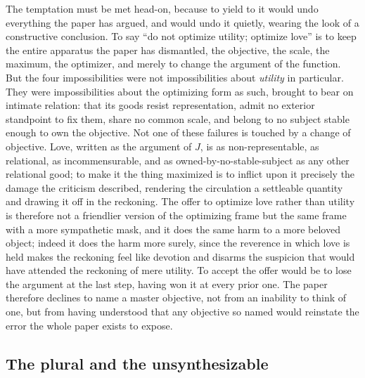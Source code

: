 The temptation must be met head-on, because to yield to it would undo everything the paper has argued, and would undo it quietly, wearing the look of a constructive conclusion. To say ``do not optimize utility; optimize love'' is to keep the entire apparatus the paper has dismantled, the objective, the scale, the maximum, the optimizer, and merely to change the argument of the function. But the four impossibilities were not impossibilities about \emph{utility} in particular. They were impossibilities about the optimizing form as such, brought to bear on intimate relation: that its goods resist representation, admit no exterior standpoint to fix them, share no common scale, and belong to no subject stable enough to own the objective. Not one of these failures is touched by a change of objective. Love, written as the argument of $J$, is as non-representable, as relational, as incommensurable, and as owned-by-no-stable-subject as any other relational good; to make it the thing maximized is to inflict upon it precisely the damage the criticism described, rendering the circulation a settleable quantity and drawing it off in the reckoning. The offer to optimize love rather than utility is therefore not a friendlier version of the optimizing frame but the same frame with a more sympathetic mask, and it does the same harm to a more beloved object; indeed it does the harm more surely, since the reverence in which love is held makes the reckoning feel like devotion and disarms the suspicion that would have attended the reckoning of mere utility. To accept the offer would be to lose the argument at the last step, having won it at every prior one. The paper therefore declines to name a master objective, not from an inability to think of one, but from having understood that any objective so named would reinstate the error the whole paper exists to expose.

\subsection*{The plural and the unsynthesizable}

